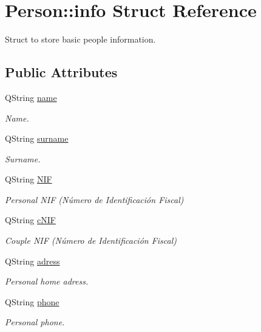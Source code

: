 \hypertarget{struct_person_1_1info}{\section{Person\+:\+:info Struct Reference}
\label{struct_person_1_1info}
}


Struct to store basic people information.  


\subsection*{Public Attributes}
\begin{DoxyCompactItemize}
\item 
Q\+String \hyperlink{struct_person_1_1info_a81051c5b2abdf064395938f2f47017b8}{name}
\begin{DoxyCompactList}\small\item\em Name. \end{DoxyCompactList}\item 
Q\+String \hyperlink{struct_person_1_1info_a5dffef4c24ab24eaa62a3428e04b4239}{surname}
\begin{DoxyCompactList}\small\item\em Surname. \end{DoxyCompactList}\item 
Q\+String \hyperlink{struct_person_1_1info_ab91922388b5ba74969a7d8f7a4fad95b}{N\+I\+F}
\begin{DoxyCompactList}\small\item\em Personal N\+I\+F (Número de Identificación Fiscal) \end{DoxyCompactList}\item 
Q\+String \hyperlink{struct_person_1_1info_a3ee6bcba23c2257f4571084e7a734e6d}{c\+N\+I\+F}
\begin{DoxyCompactList}\small\item\em Couple N\+I\+F (Número de Identificación Fiscal) \end{DoxyCompactList}\item 
Q\+String \hyperlink{struct_person_1_1info_a350817c964e878c2c59019eb51e9f608}{adress}
\begin{DoxyCompactList}\small\item\em Personal home adress. \end{DoxyCompactList}\item 
Q\+String \hyperlink{struct_person_1_1info_a07a8d88e73398595a0e0282eaffe9fef}{phone}
\begin{DoxyCompactList}\small\item\em Personal phone. \end{DoxyCompactList}\item 

\end{DoxyCompactItemize}
